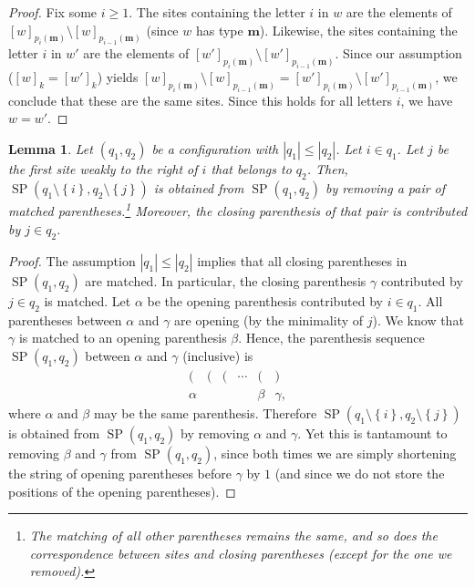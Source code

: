 \documentclass[reqno]{amsart}
\newcommand{\0}{\phantom{c}}
\DeclareMathOperator{\SP}{SP} %
\newcommand{\mm}{\mathbf{m}}
\newcommand{\set}[1]{\left\{ #1 \right\}}
\newcommand{\abs}[1]{\left| #1 \right|}
\newcommand{\tup}[1]{\left( #1 \right)}
\theoremstyle{plain}
\newtheorem{lemma}[thm]{Lemma}
\theoremstyle{definition}
\numberwithin{equation}{section}
\newcommand{\travis}[1]{\todo[size=\tiny,color=blue!30]{#1 \\ \hfill --- Travis}}
\begin{document}
\begin{proof}
Fix some $i \geq 1$.
The sites containing the letter $i$ in $w$ are the elements of $[w]_{p_i(\mm)} \setminus [w]_{p_{i-1}(\mm)}$
(since $w$ has type $\mm$).
Likewise,
the sites containing the letter $i$ in $w'$ are the elements of $[w']_{p_i(\mm)} \setminus [w']_{p_{i-1}(\mm)}$.
Since our assumption ($[w]_k = [w']_k$) yields $[w]_{p_i(\mm)} \setminus [w]_{p_{i-1}(\mm)}
= [w']_{p_i(\mm)} \setminus [w']_{p_{i-1}(\mm)}$, %
we conclude that these are the same sites.
Since this holds for all letters $i$, we have $w = w'$.
\end{proof}

\begin{lemma} \label{lem:SL.dual.1}
Let $\tup{q_1, q_2}$ be a configuration with $\abs{q_1} \leq \abs{q_2}$.
Let $i \in q_1$.
Let $j$ be the first site weakly to the right of $i$ that belongs to $q_2$.
Then, $\SP(q_1 \setminus \set{i}, q_2 \setminus \set{j})$ is obtained from $\SP(q_1, q_2)$ by removing a pair of matched parentheses.\footnote{The matching of all other parentheses remains the same, and so does the correspondence between sites and closing parentheses (except for the one we removed).}
Moreover, the closing parenthesis of that pair is contributed by $j \in q_2$.
\end{lemma}

\begin{proof}
The assumption $\abs{q_1} \leq \abs{q_2}$ implies that all closing parentheses in $\SP(q_1, q_2)$ are matched.
In particular, the closing parenthesis $\gamma$ contributed by $j \in q_2$ is matched.
Let $\alpha$ be the opening parenthesis contributed by $i \in q_1$.
All parentheses between $\alpha$ and $\gamma$ are opening (by the minimality of $j$).
We know that $\gamma$ is matched to an opening parenthesis $\beta$.
Hence, the parenthesis sequence $\SP(q_1, q_2)$ between $\alpha$ and $\gamma$ (inclusive) is
\[
\begin{array}{cccccc}
( & ( & ( & \cdots & ( & ) \\
\alpha & & & & \beta & \gamma,
\end{array}
\]
where $\alpha$ and $\beta$ may be the same parenthesis.
Therefore $\SP(q_1 \setminus \set{i}, q_2 \setminus \set{j})$ is obtained from $\SP(q_1, q_2)$ by removing $\alpha$ and $\gamma$.
Yet this is tantamount to removing $\beta$ and $\gamma$ from $\SP(q_1, q_2)$, since both times we are simply shortening the string of opening parentheses before $\gamma$ by $1$ (and since we do not store the positions of the opening parentheses).
\end{proof}
\end{document}
